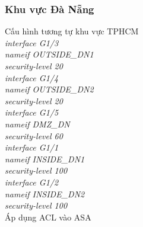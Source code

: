 \documentclass[12pt,a4paper]{report}
\begin{document}
\subsubsection{Khu vực Đà Nẵng}
\hspace*{0.25cm}Cấu hình tương tự khu vực TPHCM\\
\hspace*{2cm}\textit{interface G1/3\\
\hspace*{2cm}nameif  OUTSIDE\_DN1\\
\hspace*{2cm}security-level 20\\
\hspace*{2cm}interface G1/4\\
\hspace*{2cm}nameif OUTSIDE\_DN2\\
\hspace*{2cm}security-level 20\\
\hspace*{2cm}interface G1/5 \\
\hspace*{2cm}nameif DMZ\_DN\\
\hspace*{2cm}security-level 60\\
\hspace*{2cm}interface G1/1 \\
\hspace*{2cm}nameif INSIDE\_DN1\\
\hspace*{2cm}security-level 100 \\
\hspace*{2cm}interface G1/2 \\
\hspace*{2cm}nameif INSIDE\_DN2\\
\hspace*{2cm}security-level 100\\}
\hspace*{1cm}Áp dụng ACL vào ASA\\
\end{document}
